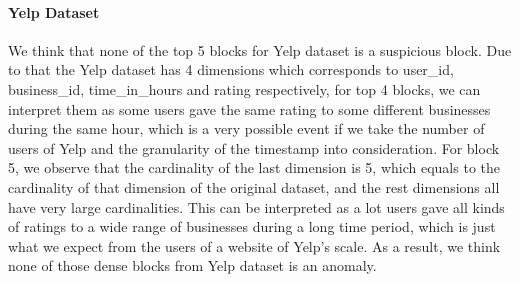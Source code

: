 \paragraph{Yelp Dataset} We think that none of the top 5 blocks for Yelp dataset is a suspicious block. Due to that the Yelp dataset has 4 dimensions which corresponds to user\_id, business\_id, time\_in\_hours and rating respectively,
for top 4 blocks, we can interpret them as some users gave the same rating to some different businesses during the same hour, which is a very possible event if we take the number of users of Yelp and the granularity of the timestamp
into consideration. For block 5, we observe that the cardinality of the last dimension is 5, which equals to the cardinality of that dimension of the original dataset, and the rest dimensions all have very large cardinalities. This can be
interpreted as a lot users gave all kinds of ratings to a wide range of businesses during a long time period, which is just what we expect from the users of a website of Yelp's scale. As a result, we think none of those dense blocks from Yelp dataset is an anomaly.
